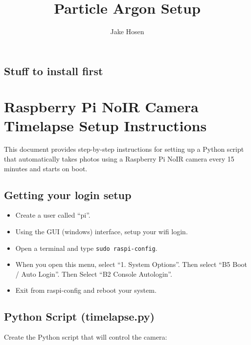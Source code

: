 \documentclass[
]{article}
\title{Particle Argon Setup}
\author{Jake Hosen}
\date{}
\providecommand{\tightlist}{%
  \setlength{\itemsep}{0pt}\setlength{\parskip}{0pt}}
\begin{document}
\maketitle

\subsection{Stuff to install first}\label{stuff-to-install-first}

\section{Raspberry Pi NoIR Camera Timelapse Setup
Instructions}\label{raspberry-pi-noir-camera-timelapse-setup-instructions}

This document provides step-by-step instructions for setting up a Python
script that automatically takes photos using a Raspberry Pi NoIR camera
every 15 minutes and starts on boot.

\subsection{Getting your login setup}\label{getting-your-login-setup}

\begin{itemize}
\tightlist
\item
  Create a user called ``pi''.
\item
  Using the GUI (windows) interface, setup your wifi login.
\item
  Open a terminal and type \texttt{sudo\ raspi-config}.
\item
  When you open this menu, select ``1. System Options''. Then select
  ``B5 Boot / Auto Login''. Then Select ``B2 Console Autologin''.
\item
  Exit from raspi-config and reboot your system.
\end{itemize}

\subsection{Python Script
(timelapse.py)}\label{python-script-timelapse.py}

Create the Python script that will control the camera:
\end{document}
